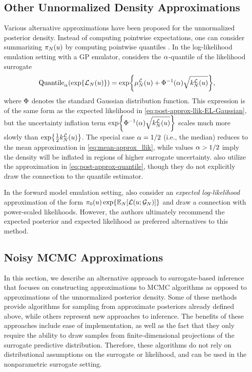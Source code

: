 \documentclass[12pt]{article}
\begin{document}
\subsection{Other Unnormalized Density Approximations}
Various alternative approximations have been proposed for the unnormalized posterior density. 
Instead of computing pointwise expectations, one can consider summarizing $\postEm[\Ndesign](\Par)$
by computing pointwise quantiles \citep{VehtariParallelGP,quantileApprox}. In the log-likelihood 
emulation setting with a GP emulator, \cite{VehtariParallelGP} considers the $\quantileProb$-quantile of 
the likelihood surrogate
\begin{equation}
\mathrm{Quantile}_{\quantileProb}(\Exp{\llikEm[\Ndesign](\Par)})
= \Exp{\emMean[\Ndesign]{\llik}(\Par) + \GaussianCDF^{-1}(\quantileProb) \sqrt{\emKer[\Ndesign]{\llik}(\Par)}},
\label{eq:post-approx-quantile}
\end{equation}
where $\GaussianCDF$ denotes the standard Gaussian distribution function. This expression is of the same form 
as the expected likelihood in \cref{eq:post-approx-llik-EL-Gaussian}, but the uncertainty inflation term 
$\Exp{\GaussianCDF^{-1}(\quantileProb) \sqrt{\emKer[\Ndesign]{\llik}(\Par)}}$ scales much more slowly than 
$\Exp{\frac{1}{2} \emKer[\Ndesign]{\llik}(\Par)}$. The special case $\quantileProb = 1/2$ (i.e., the median) 
reduces to the mean approximation in \cref{eq:mean-approx_llik}, while values $\quantileProb > 1/2$ imply 
the density will be inflated in regions of higher surrogate uncertainty. \citet{FATES_CES} also utilize the 
approximation in \cref{eq:post-approx-quantile}, though they do not explicitly draw the connection to 
the quantile estimator.

In the forward model emulation setting, \citet{BurknerSurrogate} also consider an \textit{expected log-likelihood}
approximation of the form $\priorDens(\Par) \Exp{\E_{\Ndesign}[\llik(\Par; \fwdEm[\Ndesign])]}$ and draw 
a connection with power-scaled likelihoods. However, the authors ultimately recommend the expected 
posterior and expected likelihood as preferred alternatives to this method.

\subsection{Noisy MCMC Approximations} \label{sec:MH-approx}
In this section, we describe an alternative approach to surrogate-based inference
that focuses on constructing approximations to MCMC algorithms as opposed to approximations
of the unnormalized posterior density. Some of these methods provide algorithms for sampling 
from approximate posteriors already defined above, while others represent new approaches to inference.
The benefits of these approaches include ease of implementation, as well as the fact that
they only require the ability to draw samples from finite-dimensional projections of 
the surrogate predictive distribution. Therefore, these algorithms do not rely on distributional 
assumptions on the surrogate or likelihood, and can be used in the nonparametric surrogate setting.
\end{document}
